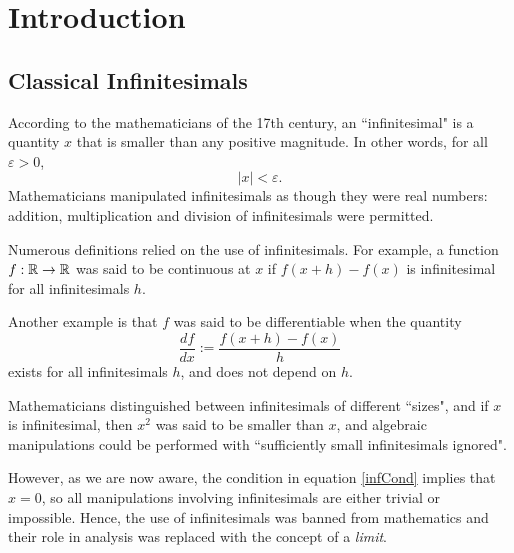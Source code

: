 
\chapter{Introduction} %

\label{Introduction} %



\section{Classical Infinitesimals}
According to the mathematicians of the 17th century, an ``infinitesimal"
is a quantity $x$ that is smaller than any positive magnitude. In other
words, for all $\varepsilon > 0$, 
\begin{equation}
\label{infCond}
    |x| < \varepsilon.
\end{equation}
Mathematicians manipulated infinitesimals
as though they were real numbers: addition, multiplication and division of infinitesimals
were permitted. 

Numerous definitions relied on the use of infinitesimals. For example,
a function $f:\mathbb{R}\rightarrow \mathbb{R}$ was said to be continuous at $x$
if $f(x+h)-f(x)$ is infinitesimal for all infinitesimals $h$.

Another example is that $f$ was said to be differentiable when the quantity
\begin{equation}
    \frac{df}{dx} := \frac{f(x+h)-f(x)}{h}
\end{equation}
exists for all infinitesimals $h$, and does not depend on $h$.

Mathematicians distinguished between infinitesimals of different ``sizes", 
and if $x$ is infinitesimal, then $x^2$ was said to be smaller than $x$,
and algebraic manipulations could be performed with ``sufficiently small
infinitesimals ignored".

However, as we are now aware, the condition in equation \ref{infCond} implies that $x = 0$, 
so all manipulations involving infinitesimals
are either trivial or impossible. Hence, the use 
of infinitesimals was banned from mathematics and their role
in analysis was replaced with the concept of a \emph{limit}.

